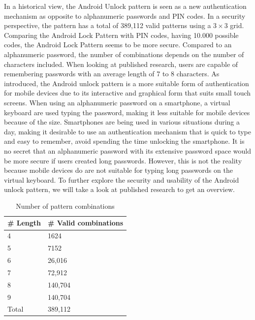   In a historical view, the Android Unlock pattern is seen as a new authentication mechanism as opposite to alphanumeric passwords and PIN codes. In a security perspective, the pattern has a total of 389,112 valid patterns using a $3\times3$ grid. Comparing the Android Lock Pattern with PIN codes, having 10.000 possible codes, the Android Lock Pattern seems to be more secure. Compared to an alphanumeric password, the number of combinations depends on the number of characters included. When looking at published research, users are capable of remembering passwords with an average length of 7 to 8 characters. As introduced, the Android unlock pattern is a more suitable form of authentication for mobile devices due to its interactive and graphical form that suits small touch screens. When using an alphanumeric password on a smartphone, a virtual keyboard are used typing the password, making it less suitable for mobile devices because of the size. Smartphones are being used in various situations during a day, making it desirable to use an authentication mechanism that is quick to type and easy to remember, avoid spending the time unlocking the smartphone. It is no secret that an alphanumeric password with its extensive password space would be more secure if users created long passwords. However, this is not the reality because mobile devices do are not suitable for typing long passwords on the virtual keyboard. To further explore the security and usability of the Android unlock pattern,  we will take a look at published research to get an overview.

	  \begin{table}[H]
	    \centering
	    \begin{tabular}{| l | l |}
	      \hline
	      {\bf \# Length} & {\bf \# Valid combinations} \\ \hline
	      4 & 1624 \\
	      5 & 7152 \\
	      6 & 26,016 \\
	      7 & 72,912 \\
	      8 & 140,704 \\
	      9 & 140,704 \\ \hline
	      Total & 389,112\\ \hline
	    \end{tabular}
	    \caption{Number of pattern combinations}
	    \label{tab:combinations}
	  \end{table}

